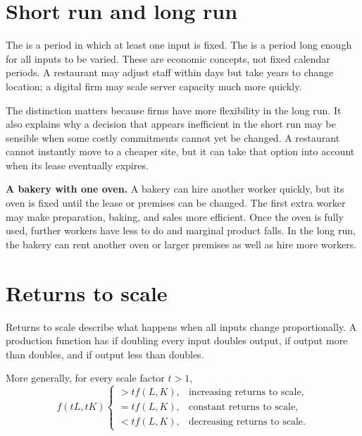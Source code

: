 \section{Short run and long run}

The  is a period in which at least one input is fixed. The  is a period long enough for all inputs to be varied. These are economic concepts, not fixed calendar periods. A restaurant may adjust staff within days but take years to change location; a digital firm may scale server capacity much more quickly.

The distinction matters because firms have more flexibility in the long run.
It also explains why a decision that appears inefficient in the short run may
be sensible when some costly commitments cannot yet be changed. A restaurant
cannot instantly move to a cheaper site, but it can take that option into
account when its lease eventually expires.

\begin{exercisebox}
\textbf{A bakery with one oven.}
A bakery can hire another worker quickly, but its oven is fixed until the
lease or premises can be changed. The first extra worker may make preparation,
baking, and sales more efficient. Once the oven is fully used, further workers
have less to do and marginal product falls. In the long run, the bakery can
rent another oven or larger premises as well as hire more workers.
\end{exercisebox}

\section{Returns to scale}

Returns to scale describe what happens when all inputs change proportionally. A production function has  if doubling every input doubles output,  if output more than doubles, and  if output less than doubles.

More generally, for every scale factor $t>1$,
\[
f(tL,tK)
\begin{cases}
>t f(L,K), & \text{increasing returns to scale},\\
=t f(L,K), & \text{constant returns to scale},\\
<t f(L,K), & \text{decreasing returns to scale}.
\end{cases}
\]

